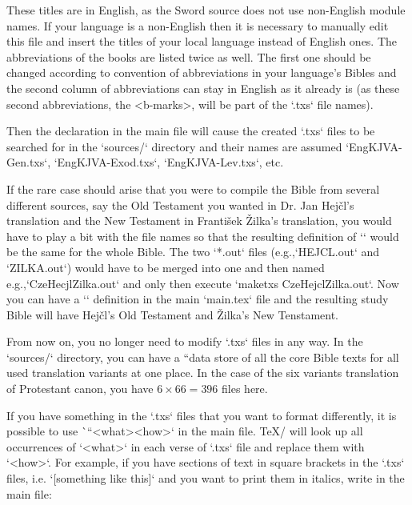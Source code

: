 These titles are in English, as the Sword source does not use non-English module names. 
If your language is a non-English then it is necessary to manually edit this file and insert the titles of your local language instead of English ones.
The abbreviations of the books are listed twice as well. The first one should be changed according to convention of abbreviations in your language's Bibles and the second column of abbreviations can stay in English as it already is (as these second abbreviations, the <b-marks>, will be part of the `.txs` file names).  

Then the declaration 
\begtt
\def\txsfile {sources/Eng\tmark-\bmark.txs}
\endtt
in the main file will cause the created `.txs` files to be searched for 
in the `sources/` directory and their names are assumed
`EngKJVA-Gen.txs`, `EngKJVA-Exod.txs`, `EngKJVA-Lev.txs`, etc.

If the rare case should arise that you were to compile the Bible from several different sources, say the Old Testament you wanted in Dr. Jan Hejčl's translation and the New Testament in František Žilka's translation, you would have to play a bit with the file names so that the resulting definition of `\tmark` would be the same for the whole Bible. The two `*.out` files (e.g.,`HEJCL.out` and `ZILKA.out`) would have to be merged into one and then named e.g.,`CzeHecjlZilka.out` and  only then execute `maketxs CzeHejclZilka.out`.  Now you can have a `\def\tmark{HejclZilka}` definition in the main `main.tex` file and 
the resulting study Bible will have Hejčl's Old Testament and Žilka's New Tenstament.




From now on, you no longer need to modify  `.txs` files in any way.
In the `sources/` directory, you can have a “data store of all the core Bible texts for all used translation variants at one place. In the case of the six variants
translation of Protestant canon, you have $6 \times 66=396$ files here.



If you have something in the `.txs` files that you want to format differently, it is 
possible to use \`\cnvtext``{<what>}{<how>}` in the main file. 
\TeX/  will look up all occurrences of `<what>` in each verse of `.txs` file and replace them with `<how>`.
For example, if you have sections of text in square brackets in the `.txs` files, i.e.
`[something like this]` and you want to print them in italics, write in the main file:
\begtt
\cnvtext{[}{\bgroup\it} \cnvtext{]}{\/\egroup}
\endtt


